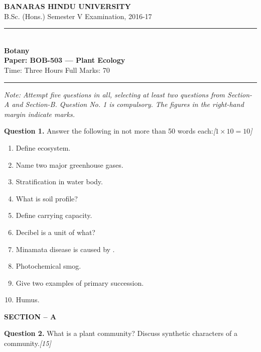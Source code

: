 \documentclass[11pt,a4paper]{article}
\newcommand{\pts}[1]{\hfill   \textit{[#1]}}
\begin{document}
\begin{center}
  {\large\bfseries BANARAS HINDU UNIVERSITY}\\[2pt]
  {\normalsize B.Sc. (Hons.) Semester V Examination, 2016-17}\\[6pt]
  \rule{0.8\linewidth}{0.5pt}\\[6pt]
  {\large\bfseries Botany}\\[4pt]
  {\large\bfseries Paper: BOB-503 --- Plant Ecology}\\[4pt]
  {\normalsize Time: Three Hours \hfill Full Marks: 70}
\end{center}

\rule{\linewidth}{0.4pt}

\smallskip



\noindent   \textit{Note: Attempt five questions in all, selecting at least two questions from Section-A and Section-B. Question No. 1 is compulsory. The figures in the right-hand margin indicate marks.}

\bigskip

\medskip


\noindent   \textbf{Question 1.} Answer the following in not more than 50 words each:\pts{$1  \times 10 = 10$}

\begin{enumerate}[label=(\roman*),leftmargin=*,itemsep=4pt,topsep=3pt]
  \item Define ecosystem.
  \item Name two major greenhouse gases.
  \item Stratification in water body.
  \item What is soil profile?
  \item Define carrying capacity.
  \item Decibel is a unit of what?
  \item Minamata disease is caused by \makebox[3cm]{\hrulefill}.
  \item Photochemical smog.
  \item Give two examples of primary succession.
  \item Humus.
\end{enumerate}

\bigskip

\begin{center}
   \textbf{SECTION -- A}
\end{center}

\medskip


\noindent   \textbf{Question 2.} What is a plant community? Discuss synthetic characters of a community.\pts{15}
\end{document}

